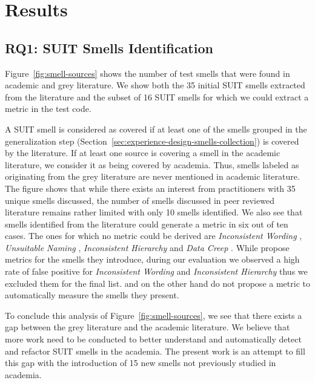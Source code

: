 \section{Results}
\label{sec:results}

\subsection{RQ1: SUIT Smells Identification}
\label{sec:results-smells-collection}

Figure~\ref{fig:smell-sources} shows the number of test smells that were found in academic and grey literature. We show both the 35 initial SUIT smells extracted from the literature and the subset of 16 SUIT smells for which we could extract a metric in the test code.

A SUIT smell is considered as covered if at least one of the smells grouped in the generalization step (Section~\ref{sec:experience-design-smells-collection}) is covered by the literature. If at least one source is covering a smell in the academic literature, we consider it as being covered by academia. Thus, smells labeled as originating from the grey literature are never mentioned in academic literature. The figure shows that while there exists an interest from practitioners with 35 unique smells discussed, the number of smells discussed in peer reviewed literature remains rather limited with only 10 smells identified. 
We also see that smells identified from the literature could generate a metric in six out of ten cases. The ones for which no metric could be derived are \emph{Inconsistent Wording} \cite{Hauptmann2013}, \emph{Unsuitable Naming} \cite{Chen2012}, \emph{Inconsistent Hierarchy} \cite{Hauptmann2013} and \emph{Data Creep} \cite{Alegroth2016b}. While \cite{Hauptmann2013} propose metrics for the smells they introduce, during our evaluation we observed a high rate of false positive for \emph{Inconsistent Wording} and \emph{Inconsistent Hierarchy} thus we excluded them for the final list. \cite{Chen2012} and \cite{Alegroth2016b} on the other hand do not propose a metric to automatically measure the smells they present. 

To conclude this analysis of Figure~\ref{fig:smell-sources}, we see that there exists a gap between the grey literature and the academic literature. We believe that more work need to be conducted to better understand and automatically detect and refactor SUIT smells in the academia. The present work is an attempt to fill this gap with the introduction of 15 new smells not previously studied in academia.

